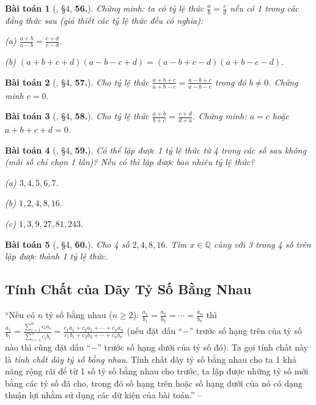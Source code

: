 \documentclass{article}
\numberwithin{equation}{section}
\newtheorem{baitoan}{Bài toán}[section]
\begin{document}
\begin{baitoan}[\cite{Binh_Toan_7_tap_1}, \S4, \textbf{56.}]
	Chứng minh: ta có tỷ lệ thức $\frac{a}{b} = \frac{c}{d}$ nếu có 1 trong các đẳng thức sau (giả thiết các tỷ lệ thức đều có nghĩa):
	\begin{enumerate*}
		\item[(a)] $\frac{a + b}{a - b} = \frac{c + d}{c - d}$.
		\item[(b)] $(a + b + c + d)(a - b - c + d) = (a - b + c - d)(a + b - c - d)$.
	\end{enumerate*}
\end{baitoan}

\begin{baitoan}[\cite{Binh_Toan_7_tap_1}, \S4, \textbf{57.}]
	Cho tỷ lệ thức $\frac{a + b + c}{a + b - c} = \frac{a - b + c}{a - b - c}$ trong đó $b\ne 0$. Chứng minh $c = 0$.
\end{baitoan}

\begin{baitoan}[\cite{Binh_Toan_7_tap_1}, \S4, \textbf{58.}]
	Cho tỷ lệ thức $\frac{a + b}{b + c} = \frac{c + d}{d + a}$. Chứng minh: $a = c$ hoặc $a + b + c + d = 0$.
\end{baitoan}

\begin{baitoan}[\cite{Binh_Toan_7_tap_1}, \S4, \textbf{59.}]
	Có thể lập được 1 tỷ lệ thức từ 4 trong các số sau không (mỗi số chỉ chọn 1 lần)? Nếu có thì lập được bao nhiêu tỷ lệ thức?
	\begin{enumerate*}
		\item[(a)] $3,4,5,6,7$.
		\item[(b)] $1,2,4,8,16$.
		\item[(c)] $1,3,9,27,81,243$.
	\end{enumerate*}
\end{baitoan}

\begin{baitoan}[\cite{Binh_Toan_7_tap_1}, \S4, \textbf{60.}]
	Cho 4 số $2,4,8,16$. Tìm $x\in\mathbb{Q}$ cùng với 3 trong 4 số trên lập được thành 1 tỷ lệ thức.
\end{baitoan}


\subsection{Tính Chất của Dãy Tỷ Số Bằng Nhau}
``Nếu có $n$ tỷ số bằng nhau ($n\ge 2$): $\frac{a_1}{b_1} = \frac{a_2}{b_2} = \cdots = \frac{a_n}{b_n}$ thì $\frac{a_1}{b_1} = \frac{\sum_{i=1}^n c_ia_i}{\sum_{i=1}^n c_ib_i} = \frac{c_1a_1 + c_2a_2 + \cdots + c_na_n}{c_1b_1 + c_2b_2 + \cdots + c_nb_n}$ (nếu đặt dấu ``$-$'' trước số hạng trên của tỷ số nào thì cũng đặt dấu ``$-$'' trước số hạng dưới của tỷ số đó). Ta gọi tính chất này là \textit{tính chất dãy tỷ số bằng nhau}. Tính chất dãy tỷ số bằng nhau cho ta 1 khả năng rộng rãi để từ 1 số tỷ số bằng nhau cho trước, ta lập được những tỷ số mới bằng các tỷ số đã cho, trong đó số hạng trên hoặc số hạng dưới của nó có dạng thuận lợi nhằm sử dụng các dữ kiện của bài toán.'' -- \cite[\S5]{Binh_Toan_7_tap_1}
\end{document}
